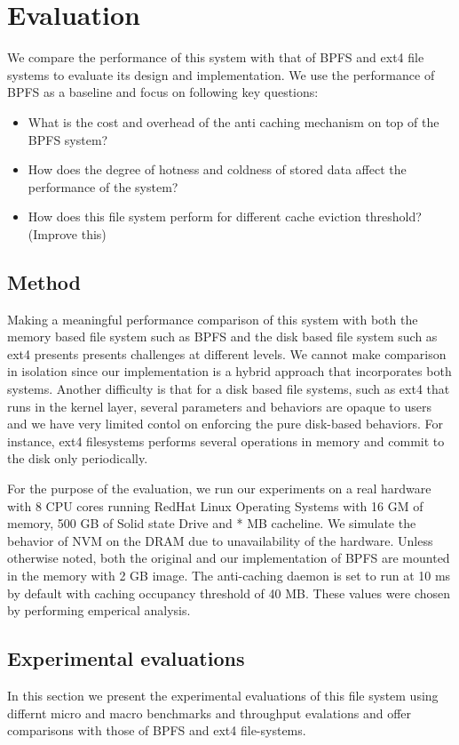 \section{Evaluation}
We compare the performance of this system with that of BPFS and ext4 file systems to evaluate its design and implementation. We use the performance of BPFS as a baseline and focus on following key questions:
\begin{itemize}
\item What is the cost and overhead of the anti caching mechanism on top of the BPFS system?
\item How does the degree of hotness and coldness of stored data affect the performance of the system?
\item How does this file system perform for different cache eviction threshold? (Improve this)
\end{itemize}

\subsection{Method}
Making a meaningful performance comparison of this system with both the memory based file system such as BPFS and the disk based file system such as ext4 presents presents challenges at different levels. We cannot make comparison in isolation since our implementation is a hybrid approach that incorporates both systems. Another difficulty is that for a disk based file systems, such as ext4 that runs in the kernel layer, several parameters and behaviors are opaque to users and we have very limited contol on enforcing the pure disk-based behaviors. For instance, ext4 filesystems performs several operations in memory and commit to the disk only periodically. 

For the purpose of the evaluation, we run our experiments on a real hardware with 8 CPU cores running RedHat Linux Operating Systems with 16 GM of memory, 500 GB of Solid state Drive and * MB cacheline. We simulate the behavior of NVM on the DRAM due to unavailability of the hardware. Unless otherwise noted, both the original and our implementation of BPFS are mounted in the memory with 2 GB image. The anti-caching daemon is set to run at 10 ms by default with caching occupancy threshold of 40 MB. These values were chosen by performing emperical analysis.    

\subsection{Experimental evaluations}
In this section we present the experimental evaluations of this file system using differnt micro and macro benchmarks and throughput evalations and offer comparisons with those of BPFS and ext4 file-systems. 



